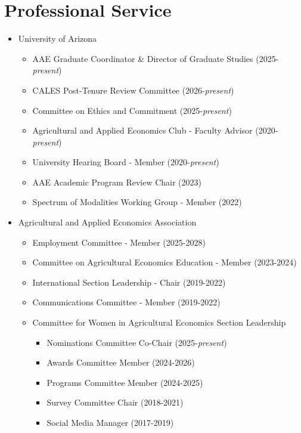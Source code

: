 \documentclass[letterpaper]{article}
\begin{document}
\section*{Professional Service}

\begin{itemize}	

\item University of Arizona

\begin{itemize}
    
\item AAE Graduate Coordinator \& Director of Graduate Studies (2025-\emph{present})

\item CALES Post-Tenure Review Committee (2026-\emph{present})

\item Committee on Ethics and Commitment (2025-\emph{present})

\item Agricultural and Applied Economics Club - Faculty Advisor (2020-\emph{present})

\item University Hearing Board - Member (2020-\emph{present})	
	
\item AAE Academic Program Review Chair (2023)
	
\item Spectrum of Modalities Working Group - Member (2022)
 
\end{itemize}

 \item Agricultural and Applied Economics Association 

\begin{itemize}
    
\item  Employment Committee - Member (2025-2028)

\item  Committee on Agricultural Economics Education - Member (2023-2024)
	
\item International Section Leadership - Chair (2019-2022) 

\item Communications Committee - Member (2019-2022) 
	
\item Committee for Women in Agricultural Economics Section Leadership
\begin{itemize}
    \item Nominations Committee Co-Chair (2025-\emph{present})
	\item Awards Committee Member (2024-2026)
	\item Programs Committee Member (2024-2025)
	\item Survey Committee Chair (2018-2021) 
	\item Social Media Manager (2017-2019) 
\end{itemize}
 
\end{itemize}

\end{itemize}
\end{document}
